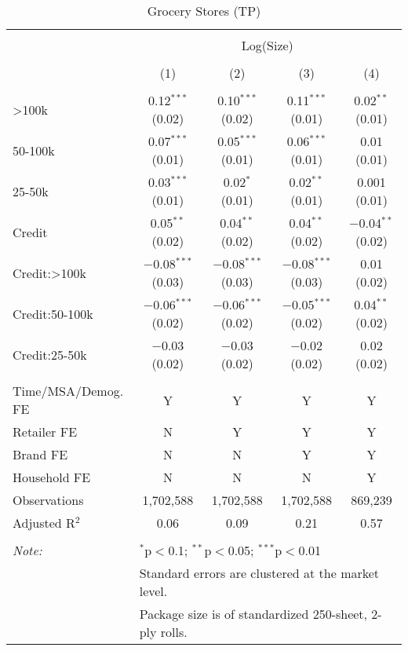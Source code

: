 
\begin{table}[!htbp] \centering 
  \caption{Grocery Stores (TP)} 
  \label{tab:packageSizeGroceryLiq} 
\begin{tabular}{@{\extracolsep{5pt}}lcccc} 
\\[-1.8ex]\hline 
\hline \\[-1.8ex] 
 & \multicolumn{4}{c}{Log(Size)} \\ 
\\[-1.8ex] & (1) & (2) & (3) & (4)\\ 
\hline \\[-1.8ex] 
 >100k & 0.12$^{***}$ (0.02) & 0.10$^{***}$ (0.02) & 0.11$^{***}$ (0.01) & 0.02$^{**}$ (0.01) \\ 
  50-100k & 0.07$^{***}$ (0.01) & 0.05$^{***}$ (0.01) & 0.06$^{***}$ (0.01) & 0.01 (0.01) \\ 
  25-50k & 0.03$^{***}$ (0.01) & 0.02$^{*}$ (0.01) & 0.02$^{**}$ (0.01) & 0.001 (0.01) \\ 
  Credit & 0.05$^{**}$ (0.02) & 0.04$^{**}$ (0.02) & 0.04$^{**}$ (0.02) & $-$0.04$^{**}$ (0.02) \\ 
  Credit:>100k & $-$0.08$^{***}$ (0.03) & $-$0.08$^{***}$ (0.03) & $-$0.08$^{***}$ (0.03) & 0.01 (0.02) \\ 
  Credit:50-100k & $-$0.06$^{***}$ (0.02) & $-$0.06$^{***}$ (0.02) & $-$0.05$^{***}$ (0.02) & 0.04$^{**}$ (0.02) \\ 
  Credit:25-50k & $-$0.03 (0.02) & $-$0.03 (0.02) & $-$0.02 (0.02) & 0.02 (0.02) \\ 
 \hline \\[-1.8ex] 
Time/MSA/Demog. FE & Y & Y & Y & Y \\ 
Retailer FE & N & Y & Y & Y \\ 
Brand FE & N & N & Y & Y \\ 
Household FE & N & N & N & Y \\ 
Observations & 1,702,588 & 1,702,588 & 1,702,588 & 869,239 \\ 
Adjusted R$^{2}$ & 0.06 & 0.09 & 0.21 & 0.57 \\ 
\hline 
\hline \\[-1.8ex] 
\textit{Note:}  & \multicolumn{4}{l}{$^{*}$p$<$0.1; $^{**}$p$<$0.05; $^{***}$p$<$0.01} \\ 
 & \multicolumn{4}{l}{Standard errors are clustered at the market level.} \\ 
 & \multicolumn{4}{l}{Package size is of standardized 250-sheet, 2-ply rolls.} \\ 
\end{tabular} 
\end{table} 
